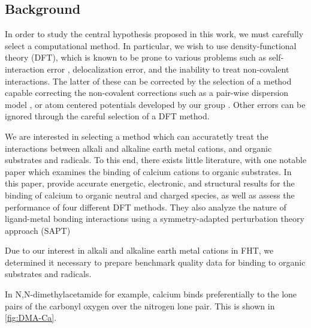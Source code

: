 \subsection{Background}

In order to study the central hypothesis proposed in this work, we must carefully select a computational method. In particular, we wish to use density-functional theory (DFT), which is known to be prone to various problems such as self-interaction error \cite{Dutoi2006}, delocalization error,\cite{OterodelaRoza2014} and the inability to treat non-covalent interactions.\cite{Johnson2009,DiLabio2016} The latter of these can be corrected by the selection of a method capable correcting the non-covalent corrections such as a pair-wise dispersion model , or atom centered potentials developed by our group . Other errors can be ignored through the careful selection of a DFT method.

We are interested in selecting a method which can accuratetly treat the interactions between alkali and alkaline earth metal cations, and organic substrates and radicals. To this end, there exists little literature, with one notable paper\cite{Suarez2011} which examines the binding of calcium cations to organic substrates. In this paper, \citet{Suarez2011} provide accurate energetic, electronic, and structural results for the binding of calcium to organic neutral and charged species, as well as assess the performance of four different DFT methods. They also analyze the nature of ligand-metal bonding interactions using a symmetry-adapted perturbation theory approach (SAPT) 

Due to our interest in alkali and alkaline earth metal cations in FHT, we determined it necessary to prepare benchmark quality data for binding to organic substrates and radicals.

 In N,N-dimethylacetamide for example, calcium
  binds preferentially to the lone pairs of the carbonyl oxygen over
  the nitrogen lone pair. This is shown in \ref{fig:DMA-Ca}.

